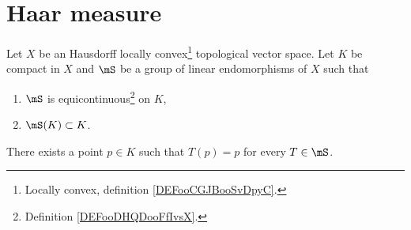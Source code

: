 \section{Haar measure}

\begin{theorem}     \label{THOooWXQFooQrWcLY}
	Let \( X\) be an Hausdorff locally convex\footnote{Locally convex, definition \ref{DEFooCGJBooSvDpyC}.} topological vector space. Let \( K\) be compact in \( X\) and \( \mS\) be a group of linear endomorphisms of \( X\) such that
	\begin{enumerate}
		\item
		      \( \mS\) is equicontinuous\footnote{Definition \ref{DEFooDHQDooFfIvsX}.} on \( K\),
		\item
		      \( \mS(K)\subset K\).
	\end{enumerate}
	There exists a point \( p\in K\) such that \( T(p)=p\) for every \( T\in \mS\).
\end{theorem}

